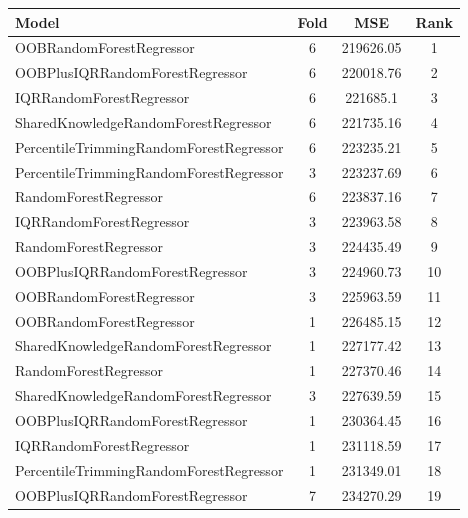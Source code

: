 \begin{table}[h]
\centering
\begin{tabular}{|l|c|c|c|}
\hline
Model & Fold & MSE & Rank \\ \hline
\textcolor[HTML]{b33dc6}{OOBRandomForestRegressor} & 6 & 219626.05 & 1 \\ \hline
\textcolor[HTML]{ede15b}{OOBPlusIQRRandomForestRegressor} & 6 & 220018.76 & 2 \\ \hline
\textcolor[HTML]{27aeef}{IQRRandomForestRegressor} & 6 & 221685.1 & 3 \\ \hline
\textcolor[HTML]{ef9b20}{SharedKnowledgeRandomForestRegressor} & 6 & 221735.16 & 4 \\ \hline
\textcolor[HTML]{f46a9b}{PercentileTrimmingRandomForestRegressor} & 6 & 223235.21 & 5 \\ \hline
\textcolor[HTML]{f46a9b}{PercentileTrimmingRandomForestRegressor} & 3 & 223237.69 & 6 \\ \hline
\textcolor[HTML]{87bc45}{RandomForestRegressor} & 6 & 223837.16 & 7 \\ \hline
\textcolor[HTML]{27aeef}{IQRRandomForestRegressor} & 3 & 223963.58 & 8 \\ \hline
\textcolor[HTML]{87bc45}{RandomForestRegressor} & 3 & 224435.49 & 9 \\ \hline
\textcolor[HTML]{ede15b}{OOBPlusIQRRandomForestRegressor} & 3 & 224960.73 & 10 \\ \hline
\textcolor[HTML]{b33dc6}{OOBRandomForestRegressor} & 3 & 225963.59 & 11 \\ \hline
\textcolor[HTML]{b33dc6}{OOBRandomForestRegressor} & 1 & 226485.15 & 12 \\ \hline
\textcolor[HTML]{ef9b20}{SharedKnowledgeRandomForestRegressor} & 1 & 227177.42 & 13 \\ \hline
\textcolor[HTML]{87bc45}{RandomForestRegressor} & 1 & 227370.46 & 14 \\ \hline
\textcolor[HTML]{ef9b20}{SharedKnowledgeRandomForestRegressor} & 3 & 227639.59 & 15 \\ \hline
\textcolor[HTML]{ede15b}{OOBPlusIQRRandomForestRegressor} & 1 & 230364.45 & 16 \\ \hline
\textcolor[HTML]{27aeef}{IQRRandomForestRegressor} & 1 & 231118.59 & 17 \\ \hline
\textcolor[HTML]{f46a9b}{PercentileTrimmingRandomForestRegressor} & 1 & 231349.01 & 18 \\ \hline
\textcolor[HTML]{ede15b}{OOBPlusIQRRandomForestRegressor} & 7 & 234270.29 & 19 \\ \hline

\end{tabular}
\end{table}
